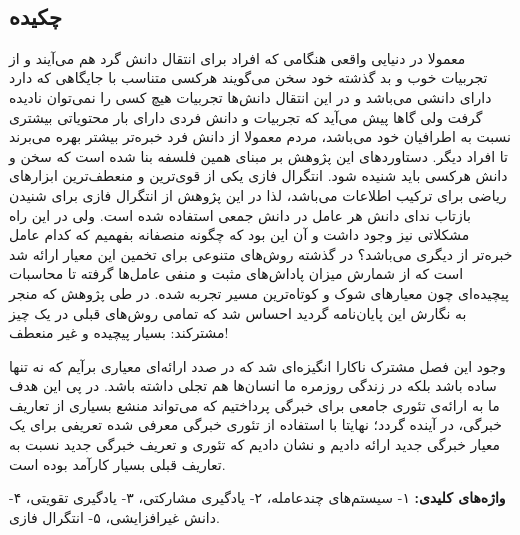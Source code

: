
\setcounter{page}{1}
\thispagestyle{empty}

~\vfill

\subsection*{چکیده}
\begin{small}
\baselineskip=0.7cm
\vspace*{0.5 cm}

معمولا در دنیایی واقعی هنگامی که افراد برای انتقال دانش گرد هم می‌آیند و از تجربیات خوب و بد گذشته خود سخن می‌گویند هرکسی متناسب با جایگاهی که دارد دارای دانشی می‌باشد و در این انتقال دانش‌ها تجربیات هیچ کسی را نمی‌توان نادیده گرفت ولی گاها پیش می‌آید که تجربیات و دانش فردی دارای بار محتویاتی بیشتری نسبت به اطرافیان خود می‌باشد، مردم معمولا از دانش فرد خبره‌تر بیشتر بهره می‌برند تا افراد دیگر. دستاورد‌های این پژوهش بر مبنای همین فلسفه بنا شده است که سخن و دانش هرکسی باید شنیده شود. انتگرال فازی یکی از قوی‌ترین و منعطف‌ترین ابزارهای ریاضی برای ترکیب اطلاعات می‌باشد، لذا در این پژوهش از انتگرال فازی برای شنیدن بازتاب ندای دانش هر عامل در دانش جمعی استفاده شده است. ولی در این راه مشکلاتی نیز وجود داشت و آن این بود که چگونه منصفانه بفهمیم که کدام عامل خبره‌تر از دیگری می‌باشد؟ در گذشته روش‌های متنوعی برای تخمین این معیار ارائه شد است که از شمارش میزان پاداش‌های مثبت و منفی عامل‌ها گرفته تا محاسبات پیچیده‌ای چون معیار‌های شوک و کوتاه‌ترین مسیر تجربه شده. در طی پژوهش که منجر به نگارش این پایان‌نامه گردید احساس شد که تمامی روش‌های قبلی در یک چیز مشترکند: بسیار پیچیده و غیر منعطف!

وجود این فصل مشترک ناکارا انگیزه‌ای شد که در صدد ارائه‌ای معیاری برآیم که نه تنها ساده باشد بلکه در زندگی روزمره ما انسان‌ها هم تجلی داشته باشد. در پی این هدف ما به ارائه‌ی تئوری جامعی برای خبرگی پرداختیم که می‌تواند منشع بسیاری از تعاریف خبرگی، در آینده گردد؛ نهایتا با استفاده از تئوری خبرگی معرفی شده تعریفی برای یک معیار خبرگی جدید ارائه دادیم و نشان دادیم که تئوری و تعریف خبرگی جدید نسبت به تعاریف قبلی بسیار کارآمد بوده است.

\noindent\textbf{واژه‌های کلیدی:}
۱- سیستم‌های چندعامله، ۲- یادگیری مشارکتی، ۳- یادگیری تقویتی، ۴- دانش غیرافزایشی، ۵- انتگرال فازی.
\end{small}